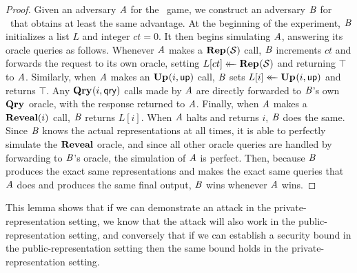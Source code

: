 \begin{proof}
Given an adversary $\mathit{A}$ for the \erreps\ game, we construct an adversary
$\mathit{B}$ for \errep\ that obtains at least the same advantage. At the beginning
of the experiment, $\mathit{B}$ initializes a list $L$ and integer $ct = 0$. It then
begins simulating $\mathit{A}$, answering its oracle queries as follows. Whenever
$\mathit{A}$ makes a $\textup{\textbf{Rep}}\hspace{0.5pt}(\mathcal{S})$ call, $\mathit{B}$ increments $ct$ and forwards the
request to its own oracle, setting $L[ct] \mathrel{\leftarrow\mkern-14mu\leftarrow} \textup{\textbf{Rep}}\hspace{0.5pt}(\mathcal{S})$ and returning
$\top$ to $\mathit{A}$. Similarly, when $\mathit{A}$ makes an $\textup{\textbf{Up}}\hspace{0.5pt}(i,\mathsf{up})$ call, $\mathit{B}$
sets $L[i] \mathrel{\leftarrow\mkern-14mu\leftarrow} \textup{\textbf{Up}}\hspace{0.5pt}(i,\mathsf{up})$ and returns $\top$. Any $\textup{\textbf{Qry}}\hspace{0.5pt}(i,\mathsf{qry})$ calls
made by $\mathit{A}$ are directly forwarded to $\mathit{B}$'s own $\textup{\textbf{Qry}}\hspace{0.5pt}$ oracle, with the
response returned to $\mathit{A}$. Finally, when $\mathit{A}$ makes a $\mathbf{Reveal}(i)$ call,
$\mathit{B}$ returns $L[i]$. When $\mathit{A}$ halts and returns $i$, $\mathit{B}$ does the
same. Since $\mathit{B}$ knows the actual representations at all times, it is able
to perfectly simulate the $\mathbf{Reveal}$ oracle, and since all other oracle queries are
handled by forwarding to $\mathit{B}$'s oracle, the simulation of $\mathit{A}$ is perfect.
Then, because $\mathit{B}$ produces the exact same representations and makes the
exact same queries that $\mathit{A}$ does and produces the same final output, $\mathit{B}$
wins whenever $\mathit{A}$ wins.
\end{proof}

This lemma shows that if we can demonstrate an attack in the
private-representation setting, we know that the attack will also work in the
public-representation setting, and conversely that if we can establish a security
bound in the public-representation setting then the same bound holds in the
private-representation setting.

